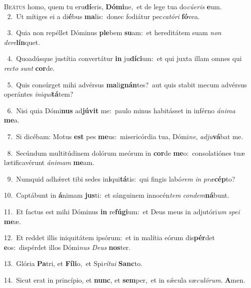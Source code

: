 \lettrine{\initial\textcolor{\initialcolor}{B}}{eátus} homo, quem tu eru\-\textbf{dí}\-eris, \textbf{Dó}\-\textbf{mi}ne,~\star et de lege tua do\-\textit{cú}\-\textit{e}\textit{ris} \textbf{e}\-um.\\
{\numbfont\textcolor{\numbcolor}{~2.}}~Ut mítiges ei a di\-\textbf{é}\-bus \textbf{ma}\-lis:~\star donec fodiátur pec\-\textit{ca}\-\textit{tó}\textit{ri} \textbf{fó}\-vea.\par
{\numbfont\textcolor{\numbcolor}{~3.}}~Quia non repéllet Dóminus \textbf{ple}\-bem \textbf{su}\-am:~\star et hereditátem suam \textit{non} \textit{de}\-\textit{re}\textbf{lín}quet.\par
{\numbfont\textcolor{\numbcolor}{~4.}}~Quoadúsque justítia convertátur \textbf{in} ju\-\textbf{dí}\-\textbf{ci}um:~\star et qui juxta illam omnes qui \textit{rec}\-\textit{to} \textit{sunt} \textbf{cor}\-de.\par
{\numbfont\textcolor{\numbcolor}{~5.}}~Quis consúrget mihi advérsus \textbf{ma}\-li\-\textbf{gnán}\-tes?~\star aut quis stabit mecum advérsus operántes \textit{in}\-\textit{i}\textit{qui}\textbf{tá}tem?\par
{\numbfont\textcolor{\numbcolor}{~6.}}~Nisi quia Dómi\textbf{nus} ad\-\textbf{jú}\-\textbf{vit} me:~\star paulo minus habitásset in inférno \textit{á}\-\textit{ni}\textit{ma} \textbf{me}\-a.\par
{\numbfont\textcolor{\numbcolor}{~7.}}~Si dicébam: Motus \textbf{est} pes \textbf{me}\-us:~\star misericórdia tua, Dómi\-\textit{ne}\-, \textit{ad}\-\textit{ju}\textbf{vá}bat me.\par
{\numbfont\textcolor{\numbcolor}{~8.}}~Secúndum multitúdinem dolórum meórum in \textbf{cor}\-de \textbf{me}\-o:~\star consolatiónes tuæ lætificavérunt \textit{á}\-\textit{ni}\textit{mam} \textbf{me}\-am.\par
{\numbfont\textcolor{\numbcolor}{~9.}}~Numquid adhǽret tibi sedes in\-\textbf{i}\-qui\-\textbf{tá}\-tis:~\star qui fingis labó\textit{rem} \textit{in} \textit{præ}\-\textbf{cép}to?\par
{\numbfont\textcolor{\numbcolor}{10.}}~Captábunt in \textbf{á}\-nimam \textbf{jus}\-ti:~\star et sánguinem innocén\textit{tem} \textit{con}\-\textit{dem}\textbf{ná}bunt.\par
{\numbfont\textcolor{\numbcolor}{11.}}~Et factus est mihi Dóminus \textbf{in} re\-\textbf{fú}\-\textbf{gi}um:~\star et Deus meus in adjutóri\textit{um} \textit{spe}\-\textit{i} \textbf{me}\-æ.\par
{\numbfont\textcolor{\numbcolor}{12.}}~Et reddet illis iniquitátem ipsórum:~\dagger et in malítia eórum dis\-\textbf{pér}\-det \textbf{e}\-os:~\star dispérdet illos Dómi\textit{nus} \textit{De}\-\textit{us} \textbf{nos}\-ter.\par
{\numbfont\textcolor{\numbcolor}{13.}}~Glória \textbf{Pa}\-tri, et \textbf{Fí}\-\textbf{li}o,~\star et Spi\-\textit{rí}\-\textit{tu}\textit{i} \textbf{Sanc}\-to.\par
{\numbfont\textcolor{\numbcolor}{14.}}~Sicut erat in princípio, et \textbf{nunc}\-, et \textbf{sem}\-per,~\star et in sǽcula sæ\-\textit{cu}\-\textit{ló}\textit{rum}. \textbf{A}\-men.\par
